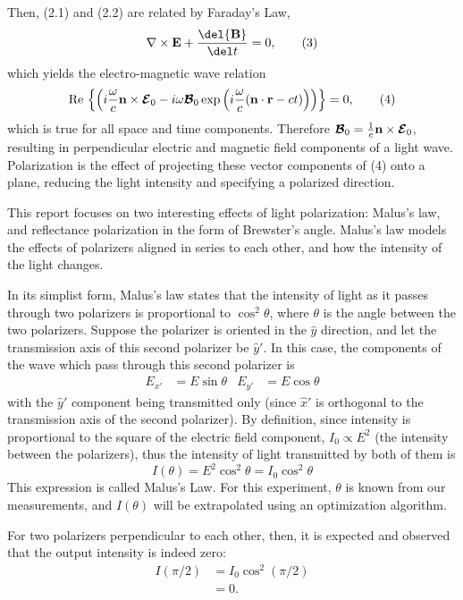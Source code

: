 \documentclass[11pt]{article}
\begin{document}
\begin{multicols}{2}
    Then, (2.1) and (2.2) are related by Faraday's Law, 
    \[\nabla\times{\bf{E}} + \frac{\del {\bf{B}}}{\del t} = 0, \tag{3}\]
    \nd which yields the electro-magnetic wave relation
    \[
        \text{Re}\,\left\{\left(i\frac{\omega}{c}{\bf{n}}\times{\boldsymbol{\mathcal{E}}_0} - i\omega{\boldsymbol{\mathcal{B}}_0}\exp\left(i\frac{\omega}{c}({\bf{n}}\cdot {\bf{r}} - ct)\right)\right)\right\} = 0,   \tag{4}
    \]
    \nd which is true for all space and time components. Therefore $\boldsymbol{\mathcal{B}}_0 = \frac{1}{c}{\bf{n}}\times \boldsymbol{\mathcal{E}}_0$, resulting in perpendicular electric and magnetic field components of a light wave. Polarization is the effect of projecting these vector components of (4) onto a plane, reducing the light intensity and specifying a polarized direction.
    
    This report focuses on two interesting effects of light polarization: Malus's law, and reflectance polarization in the form of Brewster's angle.
    \nd Malus's law models the effects of polarizers aligned in series to each other, and how the intensity of the light changes. 
    
    
    In its simplist form, Malus's law states that the intensity of light as it passes through two polarizers is proportional to $\cos^2\theta$, where $\theta$ is the angle between the two polarizers. Suppose the polarizer is oriented in the $\hat{y}$ direction, and let the transmission axis of this second polarizer be $\hat{y}'$. In this case, the components of the wave which pass through this second polarizer is
    \begin{align*}
        E_{x'} &= E \sin \theta & E_{y'} &= E \cos \theta \tag{5}
    \end{align*}
    with the $\hat{y}'$ component being transmitted only (since $\hat{x}'$ is orthogonal to the transmission axis of the second polarizer). By definition, since intensity is proportional to the square of the electric field component, $I_0 \propto E^2$ (the intensity between the polarizers), thus the intensity of light transmitted by both of them is
    \begin{equation*}
        I(\theta) = E^2 \cos^2\theta = I_0 \cos^2\theta  \tag{6}
    \end{equation*}
    This expression is called Malus's Law. For this experiment, $\theta$ is known from our measurements, and $I(\theta)$ will be extrapolated using an optimization algorithm.

    For two polarizers perpendicular to each other, then, it is expected and observed that the output intensity is indeed zero:
    \begin{align*}
        I(\pi/2) &= I_0 \cos^2(\pi/2) \tag{7}\\
        &= 0.
    \end{align*}
    

\end{multicols}
\end{document}
